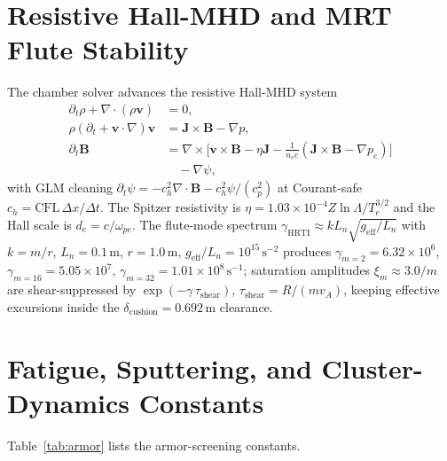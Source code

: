 \documentclass[10pt,journal,compsoc]{IEEEtran}
\begin{document}
\section{Resistive Hall-MHD and MRT Flute Stability}
\label{app:hall_mhd}
The chamber solver advances the resistive Hall-MHD system
\begin{align}
\partial_t\rho + \nabla\!\cdot(\rho\mathbf{v}) &= 0,\\
\rho(\partial_t + \mathbf{v}\!\cdot\!\nabla)\mathbf{v}
&= \mathbf{J}\times\mathbf{B} - \nabla p,\\
\partial_t\mathbf{B} &= \nabla\times\!\big[
\mathbf{v}\times\mathbf{B} - \eta\mathbf{J}
- \tfrac{1}{n_e e}(\mathbf{J}\times\mathbf{B} - \nabla p_e)\big] \nonumber\\
&\quad - \nabla\psi,
\end{align}
with GLM cleaning $\partial_t\psi = -c_h^2\nabla\!\cdot\!\mathbf{B}
- c_h^2\psi/(c_p^2)$ at Courant-safe $c_h = \mathrm{CFL}\,\Delta
x/\Delta t$. The Spitzer resistivity is
$\eta = 1.03\times10^{-4}Z\ln\Lambda/T_e^{3/2}$ and the Hall scale
is $d_e = c/\omega_{pe}$.
The flute-mode spectrum $\gamma_{\mathrm{HRTI}} \approx
kL_n\sqrt{g_{\mathrm{eff}}/L_n}$ with $k = m/r$,
$L_n = 0.1\,\mathrm{m}$, $r = 1.0\,\mathrm{m}$,
$g_{\mathrm{eff}}/L_n = 10^{15}\,\mathrm{s^{-2}}$ produces
$\gamma_{m=2} = 6.32\times10^{6}$, $\gamma_{m=16} =
5.05\times10^{7}$, $\gamma_{m=32} = 1.01\times10^{8}\,\mathrm{s^{-1}}$;
saturation amplitudes $\xi_m \approx 3.0/m$ are shear-suppressed by
$\exp(-\gamma\,\tau_{\mathrm{shear}})$, $\tau_{\mathrm{shear}} =
R/(mv_A)$, keeping effective excursions inside the
$\delta_{\mathrm{cushion}} = 0.692\,\mathrm{m}$ clearance.

\section{Fatigue, Sputtering, and Cluster-Dynamics Constants}
\label{app:materials}
Table~\ref{tab:armor} lists the armor-screening constants.

\begin{table}[h]
\centering
\caption{Armor Candidate Matrix (Coffin--Manson / Paris /
Yamamura--Eckstein)}
\label{tab:armor}
\end{table}
\end{document}
